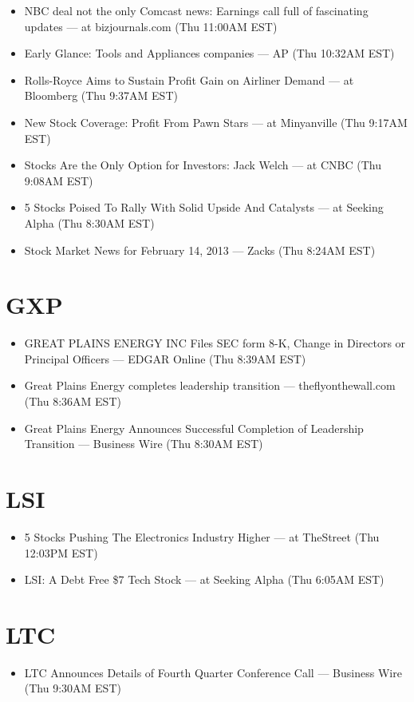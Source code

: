 \documentclass[11pt,asymmetric]{article}
\begin{document}
\begin{itemize}
\item NBC deal not the only Comcast news: Earnings call full of fascinating updates --- at bizjournals.com (Thu 11:00AM EST)
\item Early Glance: Tools and Appliances companies --- AP (Thu 10:32AM EST)
\item Rolls-Royce Aims to Sustain Profit Gain on Airliner Demand --- at Bloomberg (Thu 9:37AM EST)
\item New Stock Coverage: Profit From Pawn Stars --- at Minyanville (Thu 9:17AM EST)
\item Stocks Are the Only Option for Investors: Jack Welch --- at CNBC (Thu 9:08AM EST)
\item 5 Stocks Poised To Rally With Solid Upside And Catalysts --- at Seeking Alpha (Thu 8:30AM EST)
\item Stock Market News for February 14, 2013 --- Zacks (Thu 8:24AM EST)
\end{itemize}

\section*{GXP}
\begin{itemize}
\item GREAT PLAINS ENERGY INC Files SEC form 8-K, Change in Directors or Principal Officers --- EDGAR Online (Thu 8:39AM EST)
\item Great Plains Energy completes leadership transition --- theflyonthewall.com (Thu 8:36AM EST)
\item Great Plains Energy Announces Successful Completion of Leadership Transition --- Business Wire (Thu 8:30AM EST)
\end{itemize}

\section*{LSI}
\begin{itemize}
\item 5 Stocks Pushing The Electronics Industry Higher --- at TheStreet (Thu 12:03PM EST)
\item LSI: A Debt Free \$7 Tech Stock --- at Seeking Alpha (Thu 6:05AM EST)
\end{itemize}

\section*{LTC}
\begin{itemize}
\item LTC Announces Details of Fourth Quarter Conference Call --- Business Wire (Thu 9:30AM EST)
\end{itemize}
\end{document}
